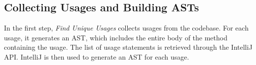 \documentclass[conference]{IEEEtran}
\begin{document}






\subsection{Collecting Usages and Building ASTs}
In the first step, \textit{Find Unique Usages} collects usages from the codebase. For each usage, it generates an AST, which includes the entire body of the method containing the usage. The list of usage statements is retrieved through the IntelliJ API. IntelliJ is then used to generate an AST for each usage. 
\par
\end{document}
